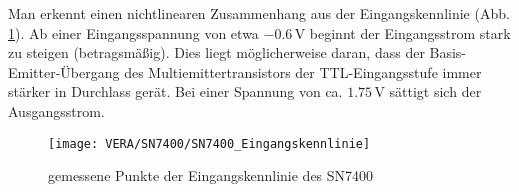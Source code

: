 Man erkennt einen nichtlinearen Zusammenhang aus der Eingangskennlinie (Abb.
\ref{fig:7400_eingang}). Ab einer Eingangsspannung von etwa $-0.6 \, \si{\volt}$
beginnt der Eingangsstrom stark zu steigen (betragsmäßig). Dies liegt
möglicherweise daran, dass der Basis-Emitter-Übergang des
Multiemittertransistors der TTL-Eingangsstufe immer stärker in Durchlass gerät. Bei einer Spannung von ca. $1.75 \, \si{\volt}$ sättigt sich der Ausgangsstrom.

\begin{figure}[h]
  \begin{center}
    \texttt{[image: VERA/SN7400/SN7400\_Eingangskennlinie]}
  \end{center}
  \caption{gemessene Punkte der Eingangskennlinie des SN7400}
  \label{fig:7400_eingang}
\end{figure}
